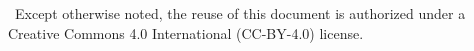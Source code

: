 \usepackage[type={CC}, modifier={by}, version={4.0}]{doclicense-di}

{%
  \copyrighttext%
  {\copyrightmetastring\ Except otherwise noted, the reuse of this
    document is authorized under a Creative Commons 4.0 International
  (CC-BY-4.0) license.}%
  {%
    \copyrightstring
    \doclicenseThis
  }
}
